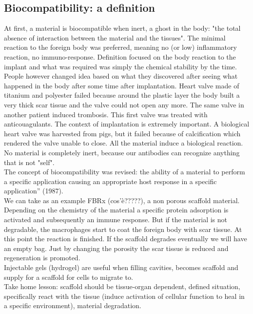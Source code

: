	\subsection{Biocompatibility: a definition}
	At first, a material is biocompatible when inert, a ghost in the body: "the total absence of interaction between the material and the tissues".
	The minimal reaction to the foreign body was preferred, meaning no (or low) inflammatory reaction, no immuno-response.
	Definition focused on the body reaction to the implant and what was required was simply the chemical stability by the time.
	\\
	People however changed idea based on what they discovered after seeing what happened in the body after some time after implantation.
	Heart valve made of titanium and polyester failed because around the plastic layer the body built a very thick scar tissue and the valve could not open any more.
	The same valve in another patient induced trombosis.
	This first valve was treated with anticouagulants.
	The context of implantation is extremely important.
	A biological heart valve was harvested from pigs, but it failed because of calcification which rendered the valve unable to close.
	All the material induce a biological reaction.
	No material is completely inert, because our antibodies can recognize anything that is not "self".
	\\
	The concept of biocompatibility was revised: the ability of a material to perform a specific application causing an appropriate host response in a specific application” (1987).
	\\
	We can take as an example FBRx (cos'è?????), a non porous scaffold material.
	Depending on the chemistry of the material a specific protein adsorption is activated and subsequently an immune response.
	But if the material is not degradable, the macrophages start to coat the foreign body with scar tissue.
	At this point the reaction is finished.
	If the scaffold degrades eventually we will have an empty bag.
	Just by changing the porosity the scar tissue is reduced and regeneration is promoted.
	\\
	Injectable gels (hydrogel) are useful when filling cavities, becomes scaffold and supply for a scaffold for cells to migrate to.
	\\
	Take home lesson: scaffold should be tissue-organ dependent, defined situation, specifically react with the tissue (induce activation of cellular function to heal in a specific environment), material degradation.

